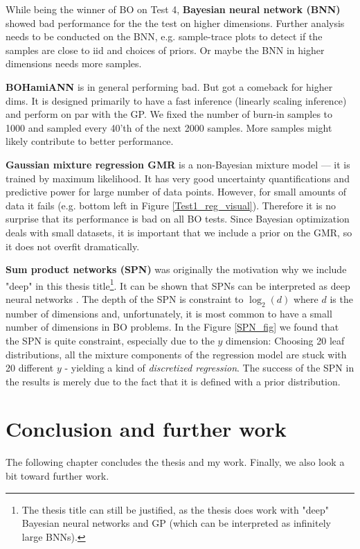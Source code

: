While being the winner of BO on Test 4, \textbf{Bayesian neural network (BNN)} showed bad
performance for the the test on higher dimensions. Further analysis needs to be conducted on the
BNN, e.g. sample-trace plots to detect if the samples are close to iid and choices of priors. Or
maybe the BNN in higher dimensions needs more samples.  

\textbf{BOHamiANN} is in general performing bad. But got a comeback for higher dims. It is designed
primarily to have a fast inference (linearly scaling inference) and perform on par
with the GP. We fixed the number of burn-in samples to 1000 and sampled every 40'th of the next 2000
samples. More samples might likely contribute to better performance. 

\textbf{Gaussian mixture regression GMR} is a non-Bayesian mixture model --- it is trained by
maximum likelihood. It has very good uncertainty quantifications and predictive power for large
number of data points. However, for small amounts of data it fails (e.g. bottom left in Figure
\ref{Test1_reg_visual}). Therefore it is no surprise that its performance is bad on all BO tests.
Since Bayesian optimization deals with small datasets, it is important that we include a prior on
the GMR, so it does not overfit dramatically. 

\textbf{Sum product networks (SPN)} was originally the motivation why we include "deep" in this thesis
title\footnote{The thesis title can still be justified, as the thesis does work with "deep" Bayesian
neural networks and GP (which can be interpreted as infinitely large BNNs).}. It can be shown that
SPNs can be interpreted as deep neural networks \cite{SPNasNN}. The depth of the SPN is constraint
to $\log_2 (d)$ where $d$ is the number of dimensions and, unfortunately, it is most common to have
a small number of dimensions in BO problems. In the Figure \ref{SPN_fig} we found that the SPN is
quite constraint, especially due to the $y$ dimension: Choosing 20 leaf distributions, all the
mixture components of the regression model are stuck with 20 different $y$ - yielding a kind of
\textit{discretized regression}. The success of the SPN in the results is merely due to the fact that it is
defined with a prior distribution.


\chapter{Conclusion and further work}
The following chapter concludes the thesis and my work. Finally, we also look a bit toward
further work. 

